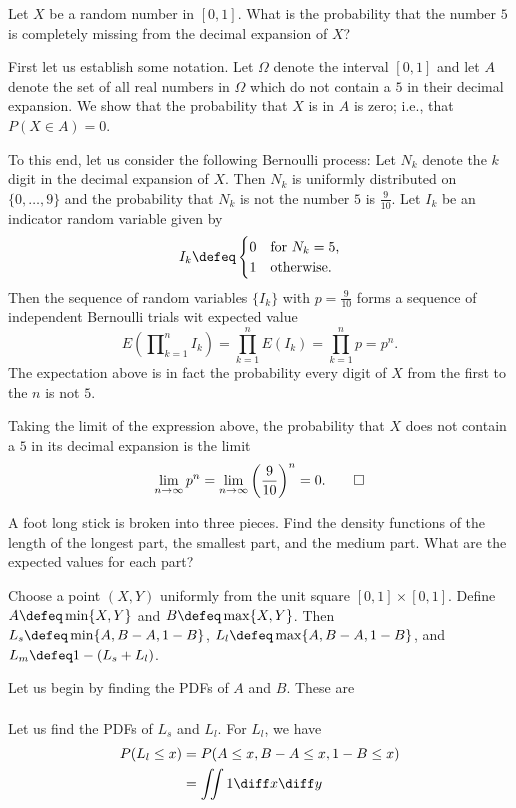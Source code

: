 \begin{problem}[Handout 18, \# 16]
  Let \(X\) be a random number in \([0,1]\). What is the probability that
  the number \(5\) is completely missing from the decimal expansion of
  \(X\)?
\end{problem}
\begin{solution}
  First let us establish some notation. Let \(\Omega\) denote the interval
  \([0,1]\) and let \(A\) denote the set of all real numbers in \(\Omega\)
  which do not contain a \(5\) in their decimal expansion. We show that the
  probability that \(X\) is in \(A\) is zero; i.e., that \(P(X\in A)=0\).

  To this end, let us consider the following Bernoulli process: Let \(N_k\)
  denote the \(k\) digit in the decimal expansion of
  \(X\). Then \(N_k\) is uniformly distributed on \(\{0,\dotsc,9\}\) and
  the probability that \(N_k\) is not the number \(5\) is
  \(\frac{9}{10}\). Let \(I_k\) be an indicator random variable given by
  \[
    I_k\defeq%
    \begin{cases}%
      0&\text{for \(N_k=5\),}\\
      1&\text{otherwise.}
    \end{cases}
  \]
  Then the sequence of random variables \(\{I_k\}\) with \(p=\frac{9}{10}\)
  forms a sequence of independent Bernoulli trials wit expected value
  \[
    E\left(\prod\nolimits_{k=1}^n I_k\right)=%
    \prod_{k=1}^n E(I_k)=%
    \prod_{k=1}^n p=p^n.
  \]
  The expectation above is in fact the probability every digit of \(X\)
  from the first to the \(n\) is not \(5\).

  Taking the limit of the expression above, the probability that \(X\) does
  not contain a \(5\) in its decimal expansion is the limit
  \[
    \lim_{n\to\infty}
    p^n=\lim_{n\to\infty}\left(\frac{9}{10}\right)^n=0.\qedhere
  \]
\end{solution}
\newpage

\begin{problem}[Handout 18, \# 17]
  A foot long stick is broken into three pieces. Find the density functions
  of the length of the longest part, the smallest part, and the medium
  part. What are the expected values for each part?
\end{problem}
\begin{solution}
  Choose a point \((X,Y)\) uniformly from the unit square
  \([0,1]\times[0,1]\). Define \(A\defeq\min\{X,Y\}\) and
  \(B\defeq\max\{X,Y\}\). Then \(L_s\defeq\min\{A,B-A,1-B\}\),
  \(L_l\defeq\max\{A,B-A,1-B\}\), and \(L_m\defeq 1-(L_s+L_l)\).

  Let us begin by finding the PDFs of \(A\) and \(B\). These are
  \begin{align*}

  \end{align*}

  Let us find the PDFs of \(L_s\) and \(L_l\). For \(L_l\), we have
  \begin{align*}
    P(L_l\leq x)
    &=P(A\leq x,B-A\leq x,1-B\leq x)\\
    &=\iint 1\diff x\diff y
  \end{align*}
\end{solution}

